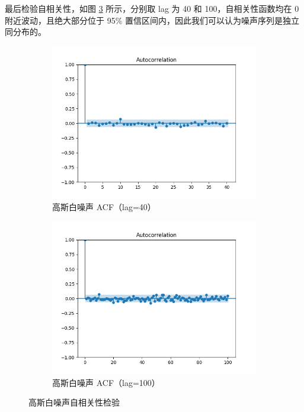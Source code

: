 最后检验自相关性，如图 \ref{fig:gaussian_acf} 所示，分别取 lag 为 40 和 100，自相关性函数均在 0 附近波动，且绝大部分位于 95\% 置信区间内，因此我们可以认为噪声序列是独立同分布的。


\begin{figure}[ht]
    \centering
    \begin{subfigure}[b]{0.48\textwidth}
        \centering
        \includegraphics[width=\textwidth]{static/gaussian_acf_40.png}
        \caption{
            高斯白噪声 ACF（lag=40）
        }\label{fig:gaussian_acf_40}
    \end{subfigure}
    \hfill
    \begin{subfigure}[b]{0.48\textwidth}
        \centering
        \includegraphics[width=\textwidth]{static/gaussian_acf_100.png}
        \caption{
            高斯白噪声 ACF（lag=100）
        }\label{fig:gaussian_acf_100}
    \end{subfigure}
    \caption{
        高斯白噪声自相关性检验
    }\label{fig:gaussian_acf}
\end{figure}